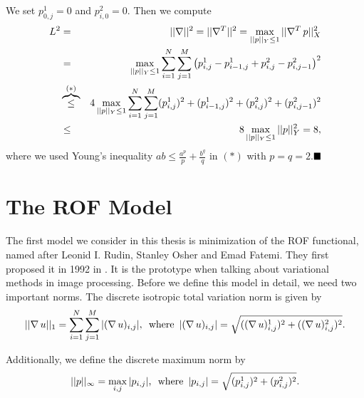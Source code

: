 \documentclass{scrreprt}
\newcommand{\qed}{$\hfill\blacksquare$}
\newenvironment{proof}[1][Proof]{\begin{trivlist}
\item[\hskip \labelsep {\bfseries #1}]}{\end{trivlist}}
\begin{document}
        \begin{proof} %

            We set $p^{1}_{0,j} = 0$ and $p^{2}_{i,0} = 0$. Then we compute
                \begin{eqnarray}
                    L^{2} &=& ||\nabla||^{2} = ||\nabla^{T}||^{2} = \max_{||p||_{Y} \le 1} ||\nabla^{T}\,p||^{2}_{X} \notag \\
                    &=& \max_{||p||_{Y} \le 1} \sum_{i = 1}^{N} \sum_{j = 1}^{M} \left( p^{1}_{i, j} - p^{1}_{i-1, j} + p^{2}_{i, j} - p^{2}_{i, j-1} \right)^{2} \notag \\
                    &\overbrace{\le}^{(\ast)}& 4 \max_{||p||_{Y} \le 1} \sum_{i = 1}^{N} \sum_{j = 1}^{M} (p^{1}_{i, j})^{2} + (p^{1}_{i-1, j})^{2} + (p^{2}_{i, j})^{2} + (p^{2}_{i, j-1})^{2} \notag \\
                    &\le& 8 \max_{||p||_{Y} \le 1} ||p||^{2}_{Y} = 8, \notag
                \end{eqnarray}
            where we used Young's inequality $ab \le \frac{a^{p}}{p} + \frac{b^{q}}{q}$ in $(\ast)$ with $p = q = 2$.\qed
        \end{proof}


    \section{The ROF Model} %
    \label{sec:the_rof_model}
        
        The first model we consider in this thesis is minimization of the ROF functional, named after Leonid I. Rudin, Stanley Osher and Emad Fatemi. They first proposed it in 1992 in \cite{ROF}. It is the prototype when talking about variational methods in image processing. Before we define this model in detail, we need two important norms. The discrete isotropic total variation norm is given by
            $$
                ||\nabla \, u||_{1} = \sum_{i = 1}^{N} \sum_{j = 1}^{M} |(\nabla \, u)_{i, j}|, \,\,\, \textnormal{where} \,\,\, |(\nabla \, u)_{i, j}| = \sqrt{((\nabla \, u)^{1}_{i, j})^{2} + ((\nabla \, u)^{2}_{i, j})^{2}}.
            $$

        Additionally, we define the discrete maximum norm by
            $$
                ||p||_{\infty} = \max_{i, j} |p_{i, j}|, \,\,\, \textnormal{where} \,\,\, |p_{i, j}| = \sqrt{(p^{1}_{i, j})^{2} + (p^{2}_{i, j})^{2}}.
            $$
\end{document}
